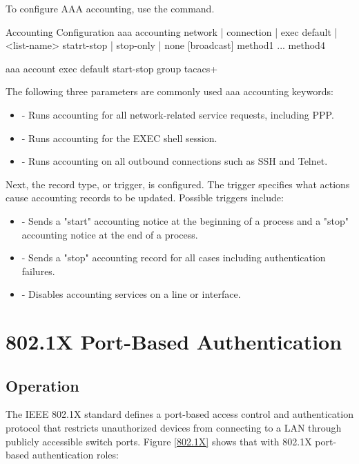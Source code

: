 To configure AAA accounting, use the  command. 

\begin{sexylisting}{Accounting Configuration}
aaa accounting {network | connection | exec} {default | <list-name>} 
         {statrt-stop | stop-only | none} [broadcast] method1 ... method4

aaa account exec default start-stop group tacacs+
\end{sexylisting}

The following three parameters are commonly used aaa accounting keywords:

\begin{itemize}
\item {} - Runs accounting for all network-related service requests, including PPP.
\item {} - Runs accounting for the EXEC shell session.
\item {} - Runs accounting on all outbound connections such as SSH and Telnet.
\end{itemize}

Next, the record type, or trigger, is configured. The trigger specifies what actions cause accounting records to be updated. Possible triggers include:

\begin{itemize}
\item {} - Sends a "start" accounting notice at the beginning of a process and a "stop" accounting notice at the end of a process.
\item {} - Sends a "stop" accounting record for all cases including authentication failures.
\item {} - Disables accounting services on a line or interface.
\end{itemize}
    

\section{802.1X Port-Based Authentication}

\subsection{Operation}

The IEEE 802.1X standard defines a port-based access control and authentication protocol that restricts unauthorized devices from connecting to a LAN through publicly accessible switch ports. Figure \ref{802.1X} shows that with 802.1X port-based authentication roles:

